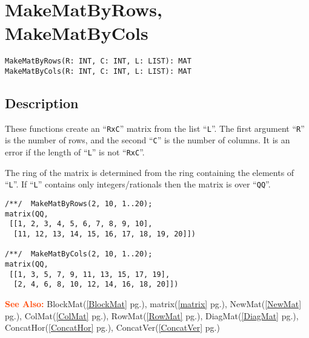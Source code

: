 \documentclass[a4paper]{mybook}
\newenvironment{command}{}{} %
\newcommand\SeeAlso{\par\textcolor{OrangeRed}{\textbf{\large See Also: }}}
\begin{document}
\section{MakeMatByRows, MakeMatByCols}
\label{MakeMatByRows, MakeMatByCols}
\begin{command} %


\begin{Verbatim}[label=syntax, rulecolor=\color{MidnightBlue},
frame=single]
MakeMatByRows(R: INT, C: INT, L: LIST): MAT
MakeMatByCols(R: INT, C: INT, L: LIST): MAT
\end{Verbatim}


\subsection*{Description}

 These functions create an ``\verb&RxC&'' matrix from the list ``\verb&L&''.
 The first argument ``\verb&R&'' is the number of rows,
 and the second ``\verb&C&'' is the number of columns.
 It is an error if the length of ``\verb&L&'' is not ``\verb&RxC&''.
\par 
 The ring of the matrix is determined from the ring containing the
 elements of ``\verb&L&''.  If ``\verb&L&'' contains only integers/rationals
 then the matrix is over ``\verb&QQ&''. 
\begin{Verbatim}[label=example, rulecolor=\color{PineGreen}, frame=single]
/**/  MakeMatByRows(2, 10, 1..20);
matrix(QQ,
 [[1, 2, 3, 4, 5, 6, 7, 8, 9, 10],
  [11, 12, 13, 14, 15, 16, 17, 18, 19, 20]])

/**/  MakeMatByCols(2, 10, 1..20);
matrix(QQ,
 [[1, 3, 5, 7, 9, 11, 13, 15, 17, 19],
  [2, 4, 6, 8, 10, 12, 14, 16, 18, 20]])
\end{Verbatim}


\SeeAlso %
  BlockMat(\ref{BlockMat} pg.\pageref{BlockMat}), 
    matrix(\ref{matrix} pg.\pageref{matrix}), 
    NewMat(\ref{NewMat} pg.\pageref{NewMat}), 
    ColMat(\ref{ColMat} pg.\pageref{ColMat}), 
    RowMat(\ref{RowMat} pg.\pageref{RowMat}), 
    DiagMat(\ref{DiagMat} pg.\pageref{DiagMat}), 
    ConcatHor(\ref{ConcatHor} pg.\pageref{ConcatHor}), 
    ConcatVer(\ref{ConcatVer} pg.\pageref{ConcatVer})
\end{command} %
\end{document}
